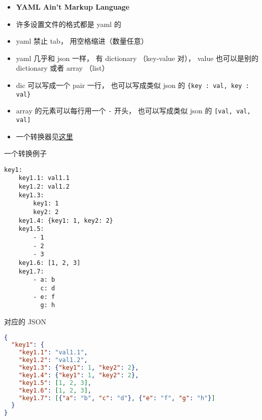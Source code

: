 

\begin{issues}
\issueDraft
\end{issues}


\begin{itemize}
\item \textbf{YAML Ain't Markup Language}
\item 许多设置文件的格式都是 yaml 的
\item yaml 禁止 tab， 用空格缩进（数量任意）
\item yaml 几乎和 json 一样， 有 dictionary （key-value 对）， value 也可以是别的 dictionary 或者 array （list）
\item dic 可以写成一个 pair 一行， 也可以写成类似 json 的 \verb|{key : val, key : val}|
\item array 的元素可以每行用一个 \verb|-| 开头， 也可以写成类似 json 的 \verb|[val, val, val]|
\item 一个转换器见\href{https://onlineyamltools.com/convert-yaml-to-json}{这里}
\end{itemize}

一个转换例子
\begin{lstlisting}[language=none]
key1:
    key1.1: val1.1
    key1.2: val1.2
    key1.3:
        key1: 1
        key2: 2
    key1.4: {key1: 1, key2: 2}
    key1.5:
        - 1
        - 2
        - 3
    key1.6: [1, 2, 3]
    key1.7:
        - a: b
          c: d
        - e: f
          g: h
\end{lstlisting}
对应的 JSON
\begin{lstlisting}[language=json]
{
  "key1": {
    "key1.1": "val1.1",
    "key1.2": "val1.2",
    "key1.3": {"key1": 1, "key2": 2},
    "key1.4": {"key1": 1, "key2": 2},
    "key1.5": [1, 2, 3],
    "key1.6": [1, 2, 3],
    "key1.7": [{"a": "b", "c": "d"}, {"e": "f", "g": "h"}]
  }
}
\end{lstlisting}

